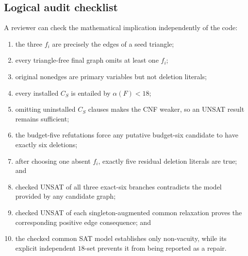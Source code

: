 \subsection{Logical audit checklist}

A reviewer can check the mathematical implication independently of the code:
\begin{enumerate}[label=\arabic*.]
\item the three \(f_i\) are precisely the edges of a seed triangle;
\item every triangle-free final graph omits at least one \(f_i\);
\item original nonedges are primary variables but not deletion literals;
\item every installed \(C_S\) is entailed by \(\alpha(F)<18\);
\item omitting uninstalled \(C_S\) clauses makes the CNF weaker, so an UNSAT
result remains sufficient;
\item the budget-five refutations force any putative budget-six candidate to
have exactly six deletions;
\item after choosing one absent \(f_i\), exactly five residual deletion
literals are true; and
\item checked UNSAT of all three exact-six branches contradicts the model
provided by any candidate graph;
\item checked UNSAT of each singleton-augmented common relaxation proves the
corresponding positive edge consequence; and
\item the checked common SAT model establishes only non-vacuity, while its
explicit independent \(18\)-set prevents it from being reported as a repair.
\end{enumerate}
